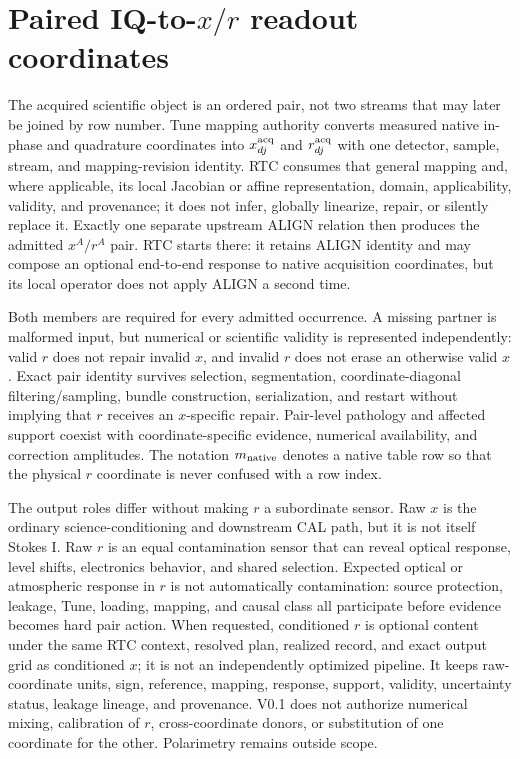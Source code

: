 \documentclass[10pt]{article}
\begin{document}
\section{Paired IQ-to-\texorpdfstring{$x/r$}{x/r} readout coordinates}
\label{sec:rat-paired-coordinates}
The acquired scientific object is an ordered pair, not two streams that may
later be joined by row number.  Tune mapping authority converts measured
native in-phase and quadrature coordinates into $x^{\rm acq}_{dj}$ and
$r^{\rm acq}_{dj}$ with one
detector, sample, stream, and mapping-revision identity.  RTC consumes that
general mapping and, where applicable, its local Jacobian or affine
representation, domain, applicability, validity, and provenance; it does not
infer, globally linearize, repair, or silently replace it.  Exactly one separate
upstream ALIGN relation then produces the admitted $x^A/r^A$ pair.  RTC starts
there: it retains ALIGN identity and may compose an optional end-to-end
response to native acquisition coordinates, but its local operator does not
apply ALIGN a second time.

Both members are required for every admitted occurrence.  A missing partner
is malformed input, but numerical or scientific validity is represented
independently: valid $r$ does not repair invalid $x$, and invalid $r$ does not
erase an otherwise valid $x$.  Exact pair identity survives selection,
segmentation, coordinate-diagonal filtering/sampling, bundle construction,
serialization, and restart without implying that $r$ receives an
$x$-specific repair.  Pair-level pathology and affected support coexist with
coordinate-specific evidence, numerical availability, and correction
amplitudes.  The notation
$m_{\rm native}$ denotes a native table row so that the physical $r$
coordinate is never confused with a row index.

The output roles differ without making $r$ a subordinate sensor.  Raw $x$ is
the ordinary science-conditioning and downstream CAL path, but it is not
itself Stokes I.  Raw $r$ is an equal contamination sensor that can reveal
optical response, level shifts, electronics behavior, and shared selection.
Expected optical or atmospheric response in $r$ is not automatically
contamination: source protection, leakage, Tune, loading, mapping, and causal
class all participate before evidence becomes hard pair action.  When
requested, conditioned $r$ is optional content under the same RTC context,
resolved plan, realized record, and exact output grid as conditioned $x$; it
is not an independently optimized pipeline.  It keeps raw-coordinate units,
sign, reference, mapping, response, support, validity, uncertainty status,
leakage lineage, and provenance.  V0.1 does not authorize numerical mixing,
calibration of $r$, cross-coordinate donors, or substitution of one coordinate
for the other.  Polarimetry remains outside scope.
\end{document}

